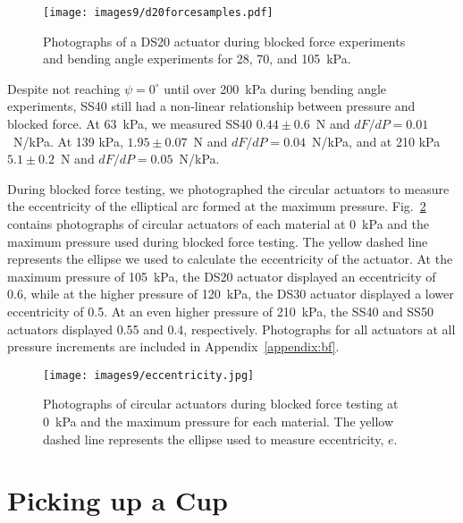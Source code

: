 \begin{figure}[!ht]
    \centering
     \texttt{[image: images9/d20forcesamples.pdf]}
    \caption{Photographs of a DS20 actuator during blocked force experiments and bending angle experiments for 28, 70, and 105~kPa.}
    \label{fig:d20force}
\end{figure}

Despite not reaching $\psi=0^\circ$ until over 200~kPa during bending angle experiments, SS40 still had a non-linear relationship between pressure and blocked force. At 63~kPa, we measured SS40 $0.44\pm0.6$~N and $dF/dP=0.01$~N/kPa. At 139 kPa, $1.95\pm0.07$~N and $dF/dP=0.04$~N/kPa, and at 210 kPa $5.1\pm0.2$~N and $dF/dP=0.05$~N/kPa. 

\clearpage
During blocked force testing, we photographed the circular actuators to measure the eccentricity of the elliptical arc formed at the maximum pressure. Fig.~\ref{fig:eccentricity} contains photographs of circular actuators of each material at 0~kPa and the maximum pressure used during blocked force testing. The yellow dashed line represents the ellipse we used to calculate the eccentricity of the actuator. At the maximum pressure of 105~kPa, the DS20 actuator displayed an eccentricity of 0.6, while at the higher pressure of 120~kPa, the DS30 actuator displayed a lower eccentricity of 0.5. At an even higher pressure of 210~kPa, the SS40 and SS50 actuators displayed 0.55 and 0.4, respectively. Photographs for all actuators at all pressure increments are included in Appendix~\ref{appendix:bf}. 
\\
\begin{figure}[!ht]
    \centering
     \texttt{[image: images9/eccentricity.jpg]}
    \caption{Photographs of circular actuators during blocked force testing at 0~kPa and the maximum pressure for each material. The yellow dashed line represents the ellipse used to measure eccentricity, $e$.}
    \label{fig:eccentricity}
\end{figure}

\section{Picking up a Cup}

